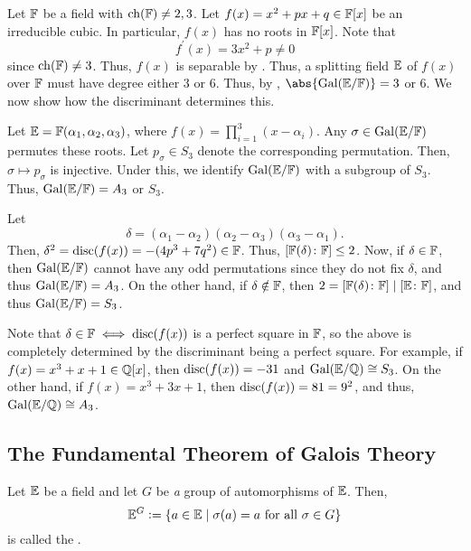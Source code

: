 \begin{ex}
    Let $\mathbb{F}$ be a field with $\operatorname{ch}(\mathbb{F}) \neq 2,3$. Let $f(x) = x^2 + px + q \in \mathbb{F}[x]$ be an irreducible cubic. In particular, $f(x)$ has no roots in $\mathbb{F}[x]$. Note that 
    \[
        f^{\prime}(x) = 3x^2 + p \neq 0
    \]
    since $\operatorname{ch}(\mathbb{F}) \neq 3$. Thus, $f(x)$ is separable by . Thus, a splitting field $\mathbb{E}$ of $f(x)$ over $\mathbb{F}$ must have degree either $3$ or $6$. Thus, by , $\abs{\Gal(\E/\F)} = 3$ or $6$. We now show how the discriminant determines this. 
    
    Let $\mathbb{E} = \mathbb{F}(\alpha_1, \alpha_2, \alpha_3)$, where $f(x) = \prod_{i=1}^3 (x-\alpha_i)$. Any $\sigma \in \operatorname{Gal}(\mathbb{E}/\mathbb{F})$ permutes these roots. Let $p_{\sigma} \in S_3$ denote the corresponding permutation. Then, $\sigma \mapsto p_{\sigma}$ is injective. Under this, we identify $\operatorname{Gal}(\mathbb{E}/\mathbb{F})$ with a subgroup of $S_3$. Thus, $\operatorname{Gal}(\mathbb{E}/\mathbb{F}) = A_3$ or $S_3$. 
    
    Let 
    \[
        \delta = (\alpha_1 - \alpha_2) (\alpha_2 - \alpha_3) (\alpha_3 - \alpha_1).
    \]
    Then, $\delta^2 = \operatorname{disc}(f(x)) = -(4p^3 + 7q^2) \in \mathbb{F}$. Thus, $\left[ \mathbb{F}(\delta) \colon \mathbb{F} \right] \leq 2$. Now, if $\delta \in \mathbb{F}$, then $\operatorname{Gal}(\mathbb{E}/\mathbb{F})$ cannot have any odd permutations since they do not fix $\delta$, and thus $\operatorname{Gal}(\mathbb{E}/\mathbb{F}) = A_3$. On the other hand, if $\delta \notin \mathbb{F}$, then $2 = \left[ \mathbb{F}(\delta) \colon \mathbb{F} \right] \mid \left[ \mathbb{E} \colon \mathbb{F} \right]$, and thus $\operatorname{Gal}(\mathbb{E}/\mathbb{F}) = S_3$.  
    
    Note that $\delta \in \mathbb{F} \iff \operatorname{disc}(f(x))$ is a perfect square in $\mathbb{F}$, so the above is completely determined by the discriminant being a perfect square. For example, if $f(x) = x^3 + x + 1 \in \mathbb{Q}[x]$, then $\operatorname{disc}(f(x)) = -31$ and $\operatorname{Gal}(\mathbb{E}/\mathbb{Q}) \cong S_3$. On the other hand, if $f(x) = x^3 + 3x + 1$, then $\operatorname{disc}(f(x)) = 81 = 9^2$, and thus, $\operatorname{Gal}(\mathbb{E}/\mathbb{Q}) \cong A_3$.
\end{ex}

\subsection{The Fundamental Theorem of Galois Theory}

\begin{defn}
    Let $\mathbb{E}$ be a field and let $G$ be \emph{a} group of automorphisms of $\mathbb{E}$. Then, 
    \[
        \mathbb{E}^G \vcentcolon= \left\{ a \in \mathbb{E} \mid \sigma(a) = a \text{ for all } \sigma \in G \right\}
    \]
    is called the .
\end{defn}

